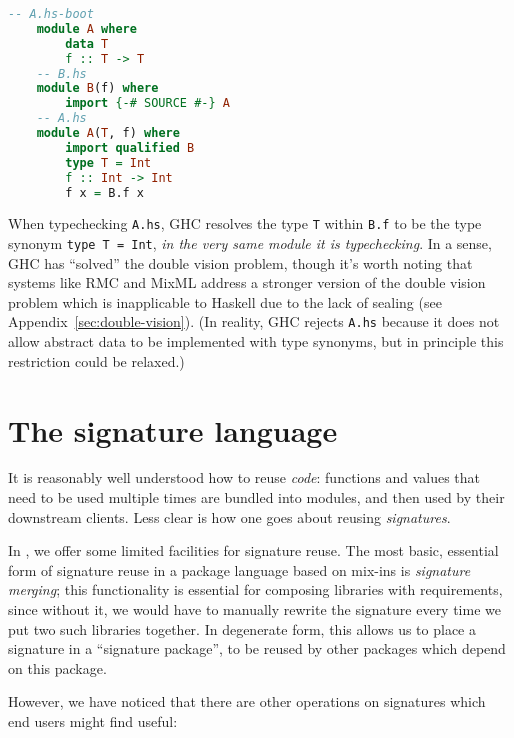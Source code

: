 \begin{lstlisting}[language=Haskell]
    -- A.hs-boot
    module A where
        data T
        f :: T -> T
    -- B.hs
    module B(f) where
        import {-# SOURCE #-} A
    -- A.hs
    module A(T, f) where
        import qualified B
        type T = Int
        f :: Int -> Int
        f x = B.f x
\end{lstlisting}
%
When typechecking \verb|A.hs|, GHC resolves the type \verb|T| within
\verb|B.f| to be the type synonym \verb|type T = Int|, \emph{in the very
same module it is typechecking}.  In a sense, GHC has ``solved'' the
double vision problem, though it's worth noting that systems like RMC
and MixML address a stronger version of the double vision problem which
is inapplicable to Haskell due to the lack of sealing (see
Appendix~\ref{sec:double-vision}).  (In reality, GHC rejects \verb|A.hs|
because it does not allow abstract data to be implemented with type
synonyms, but in principle this restriction could be relaxed.)

\section{The signature language}

It is reasonably well understood how to reuse \emph{code}: functions and
values that need to be used multiple times are bundled into modules, and then
used by their downstream clients.  Less clear is how one goes about
reusing \emph{signatures}.

In \Backpack{}, we offer some limited facilities for signature reuse.
The most basic, essential form of signature reuse in a package language
based on mix-ins is \emph{signature merging}; this functionality is
essential for composing libraries with requirements, since without it,
we would have to manually rewrite the signature every time we put two
such libraries together.  In degenerate form, this allows us to place a
signature in a ``signature package'', to be reused by other packages
which depend on this package.

However, we have noticed that there are other operations on signatures
which end users might find useful:

